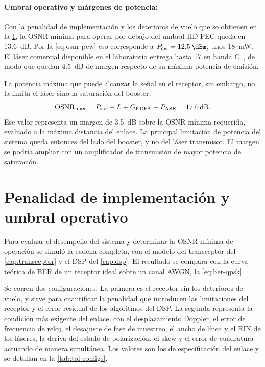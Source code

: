 \paragraph{Umbral operativo y m\'argenes de potencia:}
Con la penalidad de implementaci\'on y los deterioros de vuelo que se obtienen
en la \cref{sec:enl-verificacion}, la OSNR m\'inima para operar por debajo del
umbral HD-FEC queda en \SI{13.6}{\dB}. Por la \eqref{eq:osnr-pcw} eso
corresponde a $\Pcw = \SI{12.5}{\dBm}$, unos \SI{18}{\milli\watt}. El l\'aser
comercial disponible en el laboratorio entrega hasta \SI{17}{\dBm} en banda
C~\cite{ppcl500}, de modo que quedan \SI{4.5}{\dB} de margen respecto de su
m\'axima potencia de emisi\'on.

La potencia m\'axima que puede alcanzar la se\~nal en el receptor, sin embargo,
no la limita el l\'aser sino la saturaci\'on del booster,
\begin{equation}
  \OSNR_{\max} = P_{\mathrm{sat}} - L + G_{\mathrm{EDFA}} - P_{\mathrm{ASE}}
               = \SI{17.0}{\dB}.
  \label{eq:osnr-max}
\end{equation}
Ese valor representa un margen de \SI{3.5}{\dB} sobre la OSNR m\'inima
requerida, evaluado a la m\'axima distancia del enlace. La principal
limitaci\'on de potencia del sistema queda entonces del lado del booster, y no
del l\'aser transmisor. El margen se podr\'ia ampliar con un amplificador de
transmisi\'on de mayor potencia de saturaci\'on.

\section{Penalidad de implementaci\'on y umbral operativo}
\label{sec:enl-verificacion}

Para evaluar el desempe\~no del sistema y determinar la OSNR m\'inima de
operaci\'on se simul\'o la cadena completa, con el modelo del transceptor del
\cref{cap:transceptor} y el DSP del \cref{cap:dsp}. El resultado se compara con
la curva te\'orica de BER de un receptor ideal sobre un canal AWGN, la
\eqref{eq:ber-qpsk}.

Se corren dos configuraciones. La primera es el receptor sin los deterioros de
vuelo, y sirve para cuantificar la penalidad que introducen las limitaciones
del receptor y el error residual de los algoritmos del DSP. La segunda
representa la condici\'on m\'as exigente del enlace, con el desplazamiento
Doppler, el error de frecuencia de reloj, el desajuste de fase de muestreo, el
ancho de l\'inea y el RIN de los l\'aseres, la deriva del estado de
polarizaci\'on, el skew y el error de cuadratura actuando de manera
simult\'anea. Los valores son los de especificaci\'on del enlace y se detallan
en la \cref{tab:tol-configs}.

